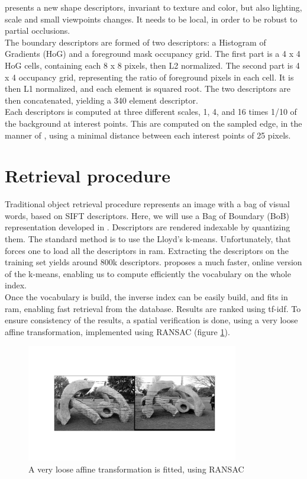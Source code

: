 \documentclass{article}
\begin{document}

\cite{Arandjelovic11} presents a new shape descriptors, invariant to texture
and color, but also lighting, scale and small viewpoints changes. It needs to
be local, in order to be robust to partial occlusions. \\
The boundary descriptors are formed of two descriptors: a Histogram of
Gradients (HoG) and a foreground mask occupancy grid. The first part is a
4 x 4 HoG cells, containing each 8 x 8 pixels, then L2 normalized. The second
part is 4 x 4 occupancy grid, representing the ratio of foreground pixels in
each cell. It is then L1 normalized, and each element is squared root. The two
descriptors are then concatenated, yielding a 340 element descriptor. \\
Each descriptors is computed at three different scales, 1, 4, and 16 times
1/10 of the background at interest points. This are computed  on the sampled
edge, in the manner of \cite{BelongieMP02}, using a minimal distance between
each interest points of 25 pixels.

\section{Retrieval procedure}

Traditional object retrieval procedure represents an image with a bag of
visual words, based on SIFT descriptors. Here, we will use a Bag of Boundary
(BoB) representation developed in \cite{Arandjelovic11}. Descriptors are
rendered indexable by quantizing them. The standard method is to use the
Lloyd's k-means. Unfortunately, that forces one to load all the descriptors in
ram. Extracting the descriptors on the training set yields around 800k
descriptors. \cite{fast-k-means} proposes a much faster, online version of
the k-means, enabling us to compute efficiently the vocabulary on the whole
index. \\
Once the vocabulary is build, the inverse index can be easily build, and fits
in ram, enabling fast retrieval from the database. Results are ranked using
tf-idf. To ensure consistency of the results, a spatial verification is done,
using a very loose affine transformation, implemented using RANSAC (figure
\ref{ransac}).

\begin{figure}
\label{ransac}
\begin{center}
\includegraphics[width=350px]{images/matching_01.png}
\end{center}
\caption{A very loose affine transformation is fitted, using RANSAC}
\end{figure}
\end{document}
